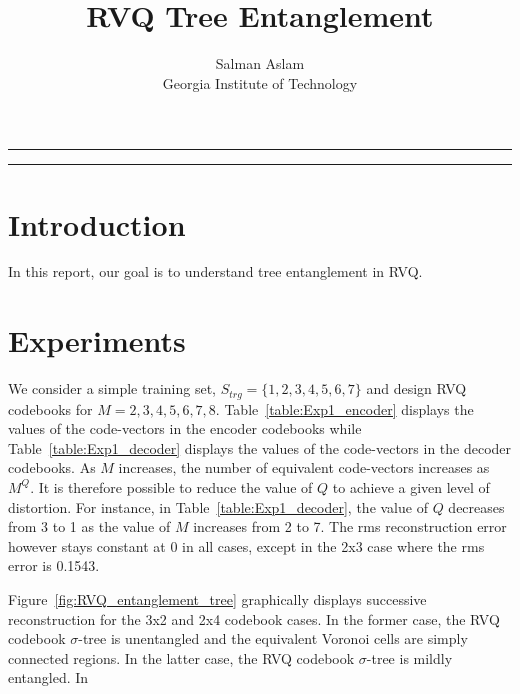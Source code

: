 
\title{RVQ Tree Entanglement}
\author{Salman Aslam\\ Georgia Institute of Technology}
\date{}


\maketitle
\rule[0pt]{\textwidth}{1pt}
\tableofcontents
\rule[0pt]{\textwidth}{1pt}


\section{Introduction}
In this report, our goal is to understand tree entanglement in RVQ.

\section{Experiments}
We consider a simple training set, $S_{trg}=\{1,2,3,4,5,6,7\}$ and design RVQ codebooks for $M=2,3,4,5,6,7,8$.  Table~\ref{table:Exp1_encoder} displays the values of the code-vectors in the encoder codebooks while Table~\ref{table:Exp1_decoder} displays the values of the code-vectors in the decoder codebooks.  As $M$ increases, the number of equivalent code-vectors increases as $M^Q$.  It is therefore possible to reduce the value of $Q$ to achieve a given level of distortion.  For instance, in Table~\ref{table:Exp1_decoder}, the value of $Q$ decreases from 3 to 1 as the value of $M$ increases from 2 to 7.  The rms reconstruction error however stays constant at 0 in all cases, except in the 2x3 case where the rms error is 0.1543.

Figure~\ref{fig:RVQ_entanglement_tree} graphically displays successive reconstruction for the 3x2 and 2x4 codebook cases.  In the former case, the RVQ codebook $\sigma$-tree is unentangled and the equivalent Voronoi cells are simply connected regions.  In the latter case, the RVQ codebook $\sigma$-tree is mildly entangled.  In~\cite{1993_JNL_RVQDSC_Barnes}


